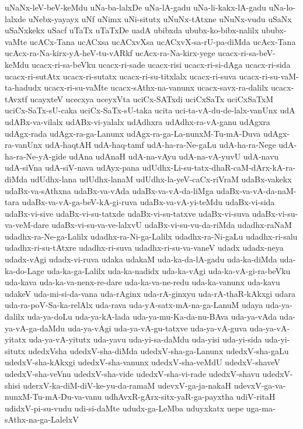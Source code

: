 {uNaNx-leV-beV-keMdu
uNa-ba-lalxDe
uNa-lA-gadu
uNa-li-kakx-lA-gadu
uNa-lo-lalxde
uNebx-yayayx
uNf
uNimx
uNi-situtx
uNuNx-tAtxne
uNuNx-vudu
uSaNx
uSaNxkekx
uSacf
uTaTx
uTaTxDe
uadA
ubibxda
ububx-ko-bibx-nalilx
ububx-vaMte
ucACx-Tana
ucACxsa
ucACxvXsa
ucACxvX-sa-rU-pa-diMda
ucAcx-Tana
ucAcx-ra-Na-kirx-yA-heV-tu-vARkf
ucAcx-ra-Na-kirx-yege
ucacx-ri-sa-beV-keMdu
ucacx-ri-sa-beVku
ucacx-ri-sade
ucacx-risi
ucacx-ri-si-dAga
ucacx-ri-sida
ucacx-ri-sutAtx
ucacx-ri-sutatx
ucacx-ri-su-titxlalx
ucacx-ri-suva
ucacx-ri-su-vaM-ta-hadudx
ucacx-ri-su-vaMte
ucacx-sAthx-na-vanunx
ucacx-savx-ra-dalilx
ucacx-tAvxtf
ucayxteV
ucecxya
uceyxVta
uciCx-SATxdi
uciCxSaTx
uciCxSaTxM
uciCx-SaTx-sU-caka
uciCx-SaTx-sU-taka
ucita
uci-ta-vA-du-de-lalx-vanUnx
udA
udABx-va-vilalx
udABx-vi-yalalx
udAdhxra
udAdhx-ra-vA-ganu
udAgxra
udAgx-rada
udAgx-ra-ga-Lanunx
udAgx-ra-ga-La-nunxM-Tu-mA-Duva
udAgx-ra-vanUnx
udA-haqtAH
udA-haq-tamf
udA-ha-ra-Ne-gaLu
udA-ha-ra-Nege
udA-ha-ra-Ne-yA-gide
udAna
udAnaH
udA-na-vAyu
udA-na-vA-yuvU
udA-navu
udA-siVna
udA-siV-nava
udAyx-pana
udUdhx-Li-su-tatx-dhaR-caM-dArx-kA-ra-diMda
udUdhx-lana
udUdhx-lanaM
udUdhx-la-yeV-caCx-riVraM
udaBx-vakekx
udaBx-va-sAthxna
udaBx-va-vAda
udaBx-va-vA-da-liMga
udaBx-va-vA-da-naM-tara
udaBx-va-vA-ga-beV-kA-gi-ruva
udaBx-va-vA-yi-teMdu
udaBx-vi-sida
udaBx-vi-sive
udaBx-vi-su-tatxde
udaBx-vi-su-tatxve
udaBx-vi-suva
udaBx-vi-su-va-veM-dare
udaBx-vi-su-va-ve-lalxvU
udaBx-vi-su-vu-da-riMda
udadhx-raNaM
udadhx-ra-Ne-ga-Lalilx
udadhx-ra-Ni-ga-Lalilx
udadhx-ra-Ni-gaLu
udadhx-ri-salu
udadhx-ri-su-tAtxre
udadhx-ri-suva
udadhx-ri-su-va-vaneV
udadx
udadx-neya
udadx-vAgi
udadx-vi-ruva
udaka
udakaM
uda-ka-da-lA-gadu
uda-ka-diMda
uda-ka-do-Lage
uda-ka-ga-Lalilx
uda-ka-nadidx
uda-ka-vAgi
uda-ka-vA-gi-ra-beVku
uda-kava
uda-ka-va-nenx-re-dare
uda-ka-va-ne-redu
uda-ka-vanunx
uda-kavu
udakeV
uda-mi-si-da-vana
uda-rAginx
uda-rA-ginxyu
uda-rA-thaR-kAkxgi
udara
uda-ra-poV-Sa-ka-relAlx
uda-rava
uda-yA-satx-mA-na-ga-LanuM
udaya
uda-ya-dalilx
uda-ya-doLu
uda-ya-kA-lada
uda-ya-mu-Ka-da-nu-BAva
uda-ya-vAda
uda-ya-vA-ga-daMdu
uda-ya-vAgi
uda-ya-vA-gu-tatxve
uda-ya-vA-guva
uda-ya-vA-yitatx
uda-ya-vA-yitutx
uda-yavu
uda-yi-sa-daMdu
uda-yisi
uda-yi-sida
uda-yi-situtx
udedxVsha
udedxV-sha-diMda
udedxV-sha-ga-Lanunx
udedxV-sha-gaLu
udedxV-sha-kAkxgi
udedxV-sha-vanunx
udedxV-sha-veMdU
udedxV-shaveV
udedxV-sha-veVnu
udedxV-sha-vide
udedxV-sha-vi-rade
udedxV-shavu
udedxV-shisi
uderxV-ka-diM-diV-ke-yu-da-ramaM
udevxV-ga-ja-nakaH
udevxV-ga-va-nunxM-Tu-mA-Du-va-vanu
udhAvxR-gArx-sitx-yaR-ga-payxtha
udiV-ritaH
udidxV-pi-su-vudu
udi-si-daMte
ududx-ga-LeMba
uduyxkatx
uepe
uga-ma-sAthx-na-ga-LalelxV
}
